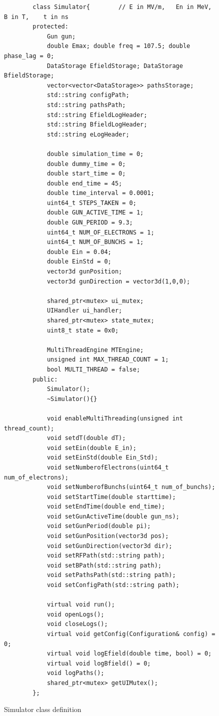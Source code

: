 \documentclass[a4paper,oneside,12pt]{report}
\numberwithin{equation}{chapter}
\begin{document}
\begin{figure}[H]
    \centering
    \captionsetup{justification=centering}
    \begin{verbatim}
        class Simulator{        // E in MV/m,   En in MeV,   B in T,    t in ns
        protected:
            Gun gun;
            double Emax; double freq = 107.5; double phase_lag = 0; 
            DataStorage EfieldStorage; DataStorage BfieldStorage;
            vector<vector<DataStorage>> pathsStorage;
            std::string configPath;
            std::string pathsPath;
            std::string EfieldLogHeader;
            std::string BfieldLogHeader;
            std::string eLogHeader;

            double simulation_time = 0;
            double dummy_time = 0;
            double start_time = 0;
            double end_time = 45;   
            double time_interval = 0.0001;
            uint64_t STEPS_TAKEN = 0;
            double GUN_ACTIVE_TIME = 1;         
            double GUN_PERIOD = 9.3;
            uint64_t NUM_OF_ELECTRONS = 1;
            uint64_t NUM_OF_BUNCHS = 1;
            double Ein = 0.04;
            double EinStd = 0;
            vector3d gunPosition;
            vector3d gunDirection = vector3d(1,0,0);

            shared_ptr<mutex> ui_mutex;
            UIHandler ui_handler;
            shared_ptr<mutex> state_mutex;
            uint8_t state = 0x0;

            MultiThreadEngine MTEngine;
            unsigned int MAX_THREAD_COUNT = 1;
            bool MULTI_THREAD = false;
        public:
            Simulator();
            ~Simulator(){}

            void enableMultiThreading(unsigned int thread_count);
            void setdT(double dT);
            void setEin(double E_in);
            void setEinStd(double Ein_Std);
            void setNumberofElectrons(uint64_t num_of_electrons);
            void setNumberofBunchs(uint64_t num_of_bunchs);
            void setStartTime(double starttime);
            void setEndTime(double end_time);
            void setGunActiveTime(double gun_ns);
            void setGunPeriod(double pi);
            void setGunPosition(vector3d pos);
            void setGunDirection(vector3d dir);
            void setRFPath(std::string path);
            void setBPath(std::string path);
            void setPathsPath(std::string path);
            void setConfigPath(std::string path);

            virtual void run();
            void openLogs();
            void closeLogs();
            virtual void getConfig(Configuration& config) = 0;
            virtual void logEfield(double time, bool) = 0;
            virtual void logBfield() = 0;
            void logPaths();
            shared_ptr<mutex> getUIMutex();
        };
    \end{verbatim}
    \caption{Simulator class definition}
    \label{fig:sim_class}
\end{figure}
\end{document}
